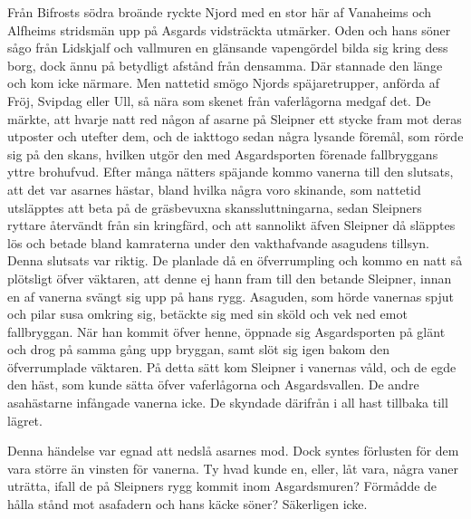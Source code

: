 Från Bifrosts södra broände ryckte Njord med en stor här af Vanaheims
och Alfheims stridsmän upp på Asgards vidsträckta utmärker. Oden och
hans söner sågo från Lidskjalf och vallmuren en glänsande vapengördel
bilda sig kring
\protect\hypertarget{lb1625905.xhtmlux5cux23start149}{}{}\protect\hypertarget{lb1625905.xhtmlux5cux23start149-a}{}{}\protect\hypertarget{lb1625905.xhtmlux5cux23start149-b}{}{}\protect\hypertarget{lb1625905.xhtmlux5cux23start149-c}{}{}\protect\hypertarget{lb1625905.xhtmlux5cux23start149-d}{}{}
dess borg, dock ännu på betydligt afstånd från densamma. Där stannade
den länge och kom icke närmare. Men nattetid smögo Njords
späjaretrupper, anförda af Fröj, Svipdag eller Ull, så nära som skenet
från vaferlågorna medgaf det. De märkte, att hvarje natt red någon af
asarne på Sleipner ett stycke fram mot deras utposter och utefter dem,
och de iakttogo sedan några lysande föremål, som rörde sig på den skans,
hvilken utgör den med Asgardsporten förenade fallbryggans yttre
brohufvud. Efter många nätters späjande kommo vanerna till den slutsats,
att det var asarnes hästar, bland hvilka några voro skinande, som
nattetid utsläpptes att beta på de gräsbevuxna skanssluttningarna, sedan
Sleipners ryttare återvändt från sin kringfärd, och att sannolikt äfven
Sleipner då släpptes lös och betade bland kamraterna under den
vakthafvande asagudens tillsyn. Denna slutsats var riktig. De planlade
då en öfverrumpling och kommo en natt så plötsligt öfver väktaren, att
denne ej hann fram till den betande Sleipner, innan en af vanerna svängt
sig upp på hans rygg. Asaguden, som hörde vanernas spjut och pilar susa
omkring sig, betäckte sig med sin sköld och vek ned emot fallbryggan.
När han kommit öfver henne, öppnade sig Asgardsporten på glänt och drog
på samma gång upp bryggan, samt slöt sig igen bakom den öfverrumplade
väktaren. På detta sätt kom Sleipner i vanernas våld, och de egde den
häst, som kunde sätta öfver vaferlågorna och Asgardsvallen. De andre
asahästarne infångade vanerna icke. De skyndade därifrån i all hast
tillbaka till lägret.

Denna händelse var egnad att nedslå asarnes mod. Dock syntes förlusten
för dem vara större än vinsten för vanerna. Ty hvad kunde en, eller, låt
vara, några vaner uträtta, ifall de på Sleipners rygg kommit inom
Asgardsmuren? Förmådde de hålla stånd mot asafadern och hans käcke
söner? Säkerligen icke.

